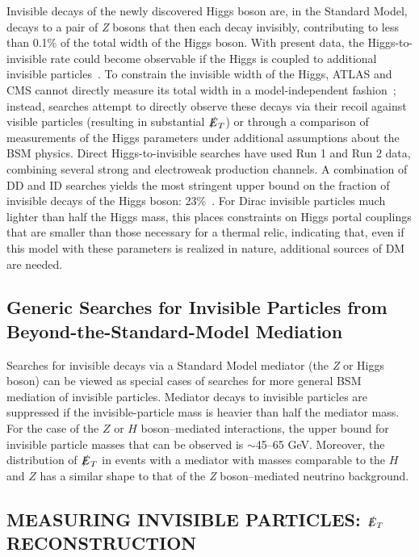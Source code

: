 \documentclass{ar-1col}
\newcommand{\IP}{invisible particle}
\newcommand{\MET}{\ensuremath{\slashed{E}_T}\xspace}
\begin{document}
{Invisible decays of the newly discovered Higgs boson are, in the Standard Model,
decays to a pair of \textit{Z} bosons that then each decay invisibly,
contributing to less than 0.1\% of the total width of the Higgs boson. 
With present data, the Higgs-to-invisible rate could become observable
if the Higgs is coupled to additional
{\IP}s~\cite{Khachatryan:2016vau,Aad:2015pla}. To constrain the
invisible width of the Higgs, ATLAS and CMS cannot directly
measure its total width in a model-independent
fashion~\cite{Dobrescu:2012td}; instead, searches attempt to
directly observe these decays via their recoil against visible
particles (resulting in substantial \MET) or through a comparison of measurements of the
Higgs parameters under additional assumptions about the BSM
physics. Direct Higgs-to-invisible searches have used Run 1 and
Run 2 data, combining several strong and electroweak production
channels. A combination of DD and ID searches yields the most
stringent upper bound on the fraction of invisible decays of the Higgs
boson: 23\%~\cite{Khachatryan:2016whc,Aad:2015pla}. 
For Dirac {\IP}s much lighter than half the Higgs mass, 
this places constraints on Higgs portal couplings that are smaller than those necessary for a thermal relic, 
indicating that, even if this model with these parameters is realized in nature, 
additional sources of DM are needed. 

\subsection{Generic Searches for Invisible Particles from Beyond-the-Standard-Model Mediation}\label{sec:results_monoXSearches}

Searches for invisible decays via a Standard Model mediator (the \textit{Z} or Higgs boson)
can be viewed as special cases of searches for more general BSM
mediation of {\IP}s. Mediator decays to {\IP}s are
suppressed if the {invisible-particle} mass is heavier than half the mediator mass.
For the case of the $Z$ or $H$ boson--mediated interactions, the upper
bound for {\IP} masses that can be observed is $\sim$45--65 GeV. 
Moreover, the distribution of \MET in events with a mediator with masses comparable 
to the $H$ and $Z$ has a similar shape to that of
the \textit{Z} boson--mediated neutrino background.

\begin{textbox}
\section{MEASURING INVISIBLE PARTICLES: \MET RECONSTRUCTION}


\end{textbox}}
\end{document}
